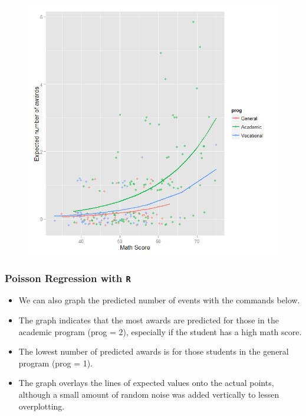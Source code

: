 \documentclass[00-GLMregslides.tex]{subfiles}
\begin{document}
\begin{frame}

\begin{figure}
\centering
\includegraphics[width=0.99\linewidth]{poisson2}
\end{figure}

\end{frame}
\begin{frame}[fragile]
\frametitle{Poisson Regression with \texttt{R}}
\Large

\begin{itemize}
\item We can also graph the predicted number of events with the commands below. 
\item The graph indicates that the most awards are predicted for those in the academic program (prog = 2), 
especially if the student has a high math score. 
\item The lowest number of predicted awards is for those students in the general program (prog = 1). 
\item The graph overlays the lines of expected values onto the actual points, although a small amount of random noise was added vertically to lessen overplotting.
\end{itemize}
\end{frame}
\end{document}
